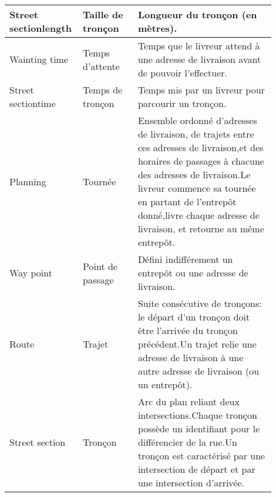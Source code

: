 \begin{longtable}{|p{0.2\linewidth}|p{0.2\linewidth}|p{0.5\linewidth}|}
Street sectionlength                        & Taille de tronçon              & Longueur du tronçon (en mètres).                                                                                                                                                                                                                                                    \\ \hline
Wainting time                               & Temps d'attente                & Temps que le livreur attend à une adresse de livraison avant de pouvoir l'effectuer.                                                                                                                                                                                                \\ \hline
Street sectiontime                          & Temps de tronçon               & Temps mis par un livreur pour parcourir un tronçon.                                                                                                                                                                                                                                 \\ \hline
Planning                                    & Tournée                        & Ensemble ordonné d'adresses de livraison, de trajets entre ces adresses de livraison,et des horaires de passages à chacune des adresses de livraison.Le livreur commence sa tournée en partant de l'entrepôt donné,livre chaque adresse de livraison, et retourne au même entrepôt. \\ \hline
Way point                                   & Point de passage               & Défini indifférement un entrepôt ou une adresse de livraison.                                                                                                                                                                                                                       \\ \hline
Route                                       & Trajet                         & Suite consécutive de tronçons: le départ d'un tronçon doit être l'arrivée du tronçon précédent.Un trajet relie une adresse de livraison à une autre adresse de livraison (ou un entrepôt).                                                                                          \\ \hline
Street section                              & Tronçon                        & Arc du plan reliant deux intersections.Chaque tronçon possède un identifiant pour le différencier de la rue.Un tronçon est caractérisé par une intersection de départ et par une intersection d'arrivée.                                                                            \\ \hline

\end{longtable}
